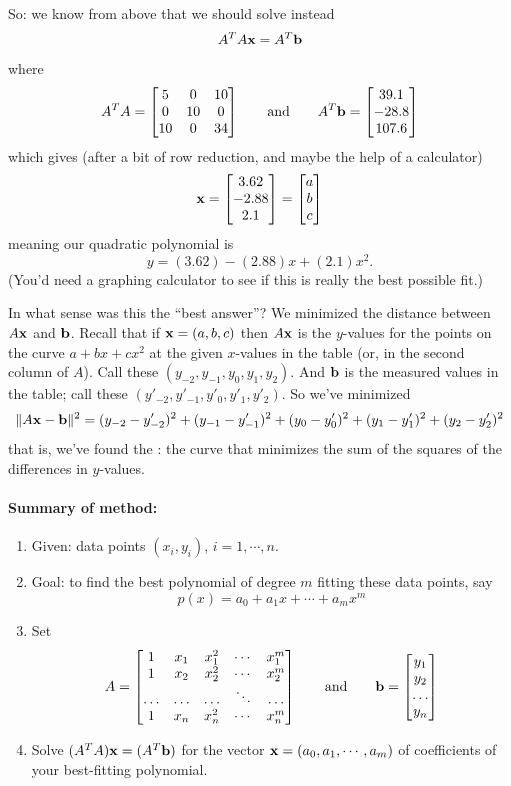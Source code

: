 \begin{myprob}
\begin{mysol}
So:  we know from above that we should solve instead
$$
A^TA \mathbf{x} = A^T\mathbf{b}
$$
where
$$
A^TA = \left[ \begin{matrix} 5&0&10\\0&10&0\\10&0&34 \end{matrix} \right]
\qquad
\textrm{and} 
\qquad 
A^T\mathbf{b} = \left[ \begin{matrix} 39.1\\-28.8\\107.6 \end{matrix} \right]
$$
which gives (after a bit of row reduction, and maybe the help of a calculator)
$$
\mathbf{x} = \left[ \begin{matrix} 3.62\\-2.88\\2.1 \end{matrix} \right] = \left[ \begin{matrix} a\\b\\c \end{matrix} \right]
$$
meaning our quadratic polynomial is
$$
y = (3.62) - (2.88)x + (2.1) x^2.
$$
(You'd need a graphing calculator to see if this is really the best possible fit.)
\end{mysol}\end{myprob}

In what sense was this the ``best answer''?  We minimized the distance between
$A\mathbf{x}$ and $\mathbf{b}$.  Recall that if $\mathbf{x} = (a,b,c)$ then $A\mathbf{x}$ is
the $y$-values for the points on the curve $a+bx+cx^2$ at the given
$x$-values in the table (or, in the second column of $A$). Call these $(y_{-2}, y_{-1}, y_0, y_1, y_2)$.
 And $\mathbf{b}$
is the measured values in the table; call these $(y'_{-2}, y'_{-1}, y'_0, y'_1, y'_2)$.
So we've minimized
$$
\Vert A\mathbf{x} - \mathbf{b} \Vert^2 = (y_{-2}-y'_{-2})^2 + (y_{-1}-y'_{-1})^2 + (y_0-y'_0)^2 + (y_1-y'_1)^2 + (y_2-y'_2)^2
$$
that is, we've found the  : the curve that minimizes the sum of the squares
of the differences in $y$-values.


\paragraph{Summary of method:}

\begin{enumerate}
\item Given: data points $(x_i,y_i)$, $i=1,\cdots, n$.
\item Goal: to find the best polynomial of degree $m$ fitting these data points, say
$$
p(x) = a_0 + a_1x+ \cdots + a_mx^m
$$
\item Set $$
A = \left[ \begin{matrix} 1 & x_1 & x_1^2 & \cdots & x_1^m \\
1 & x_2 & x_2^2 & \cdots & x_2^m \\
\ldots & \ldots & \ldots & \ddots & \ldots \\
1 & x_n & x_n^2 & \cdots & x_n^m \end{matrix} \right]
\qquad \textrm{and} \qquad
\mathbf{b} = \left[ \begin{matrix} y_1\\y_2 \\ \ldots \\ y_n \end{matrix} \right]
$$
\item Solve $(A^TA) \mathbf{x} = (A^T\mathbf{b})$ for the vector $\mathbf{x} = (a_0,a_1, \cdots, a_m)$
of coefficients of your best-fitting polynomial.
\end{enumerate}



